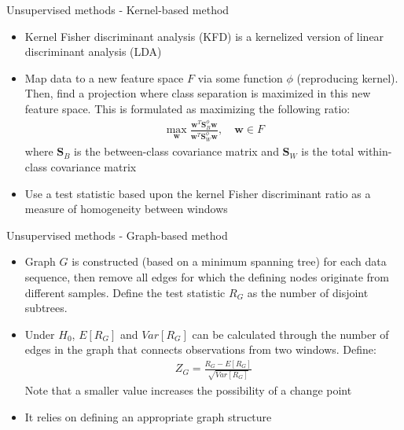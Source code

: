 \documentclass{beamer}
\begin{document}
\begin{frame}{Unsupervised methods - Kernel-based method}
    \begin{itemize}
        
        \item Kernel Fisher discriminant analysis (KFD) is a kernelized version of linear discriminant analysis (LDA)
        
        \item Map data to a new feature space $F$ via some function $\phi$ (reproducing kernel). Then, find a projection where class separation is maximized in this new feature space. This is formulated as maximizing the following ratio:
        \begin{align*}
            \max_{\mathbf{w}} \frac{\mathbf{w}^T\mathbf{S}_B^\phi\mathbf{w}}{\mathbf{w}^T\mathbf{S}_W^\phi\mathbf{w}}, \quad \mathbf{w} \in F
        \end{align*}
        where $\mathbf{S}_B$ is the between-class covariance matrix and $\mathbf{S}_W$ is the total within-class covariance matrix
        
        
        \item Use a test statistic based upon the kernel Fisher discriminant ratio as a measure of homogeneity between windows
    \end{itemize}
\end{frame}

\begin{frame}{Unsupervised methods - Graph-based method}
    \begin{itemize}
        \item Graph $G$ is constructed (based on a minimum spanning tree) for each data sequence, then remove all edges for which the defining nodes originate from different samples. Define the test statistic $R_G$ as the number of disjoint subtrees.

        \item Under $H_0$, $E[R_G]$ and $Var[R_G]$ can be calculated through the number of edges in the graph that connects observations from two windows. Define:
        \begin{align*}
            Z_G = \frac{R_G - E[R_G]}{\sqrt{Var[R_G]}}
        \end{align*}
        Note that a smaller value increases the possibility of a change point

        \item It relies on defining an appropriate graph structure
    \end{itemize}
\end{frame}
\end{document}

